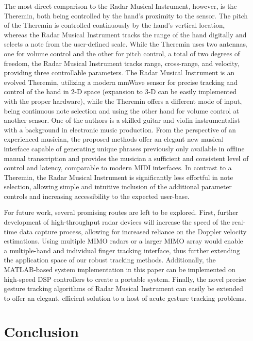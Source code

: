 \documentclass[10pt,journal,final]{IEEEtran}
\begin{document}
The most direct comparison to the Radar Musical Instrument, however, is the Theremin, both being controlled by the hand's proximity to the sensor. The pitch of the Theremin is controlled continuously by the hand's vertical location, whereas the Radar Musical Instrument tracks the range of the hand digitally and selects a note from the user-defined scale. While the Theremin uses two antennas, one for volume control and the other for pitch control, a total of two degrees of freedom, the Radar Musical Instrument tracks range, cross-range, and velocity, providing three controllable parameters. The Radar Musical Instrument is an evolved Theremin, utilizing a modern mmWave sensor for precise tracking and control of the hand in 2-D space (expansion to 3-D can be easily implemented with the proper hardware), while the Theremin offers a different mode of input, being continuous note selection and using the other hand for volume control at another sensor. One of the authors is a skilled guitar and violin instrumentalist with a background in electronic music production. From the perspective of an experienced musician, the proposed methods offer an elegant new musical interface capable of generating unique phrases previously only available in offline manual transcription and provides the musician a sufficient and consistent level of control and latency, comparable to modern MIDI interfaces. In contrast to a Theremin, the Radar Musical Instrument is significantly less effortful in note selection, allowing simple and intuitive inclusion of the additional parameter controls and increasing accessibility to the expected user-base.

For future work, several promising routes are left to be explored. First, further development of high-throughput radar devices will increase the speed of the real-time data capture process, allowing for increased reliance on the Doppler velocity estimations. Using multiple MIMO radars or a larger MIMO array would enable a multiple-hand and individual finger tracking interface, thus further extending the application space of our robust tracking methods. Additionally, the MATLAB-based system implementation in this paper can be implemented on high-speed DSP controllers to create a portable system. Finally, the novel precise gesture tracking algorithms of Radar Musical Instrument can easily be extended to offer an elegant, efficient solution to a host of acute gesture tracking problems. 

\section{Conclusion}
\label{sec:conclusion}
\end{document}

